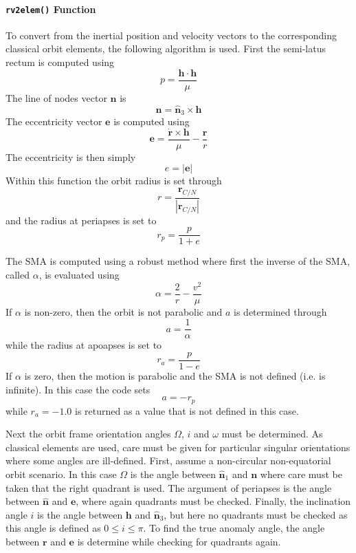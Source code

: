 \paragraph{{\tt rv2elem()} Function}
To convert from the inertial position and velocity vectors to the corresponding classical orbit elements, the following algorithm is used.  First the semi-latus rectum is computed using
\begin{equation}
	p = \frac{\bm h \cdot \bm h}{\mu}
\end{equation}
The line of nodes vector $\bm n$ is 
\begin{equation}
	\bm n = \hat{\bm n}_{3} \times \bm h
\end{equation}
The eccentricity vector $\bm e$ is computed using\cite{schaub}
\begin{equation}
	\bm e = \frac{\dot{\bm r} \times \bm h}{\mu} - \frac{\bm r}{r}
\end{equation}
The eccentricity is then simply
\begin{equation}
	e = |\bm e|
\end{equation}
Within this function the orbit radius is set through
\begin{equation}
	r = \frac{\bm r_{C/N}}{ | \bm r_{C/N}|}
\end{equation}
and the radius at periapses is set to
\begin{equation}
	r_{p} = \frac{p}{1 + e}
\end{equation}

The SMA is computed using a robust method where first the inverse of the SMA, called $\alpha$, is evaluated using\cite{schaub}
\begin{equation}
	\alpha = \frac{2}{r} - \frac{v^{2}}{\mu}
\end{equation}
If $\alpha$ is non-zero, then the orbit is not parabolic and $a$ is determined through
\begin{equation}
	a = \frac{1}{\alpha}
\end{equation}
while the radius at apoapses is set to
\begin{equation}
	r_{a} = \frac{p}{1 - e}
\end{equation}
If $\alpha$ is zero, then the motion is parabolic and the SMA is not defined (i.e. is infinite).  In this case the code sets 
$$
	a = -r_{p}
$$
while $r_{a} = -1.0$ is returned as a value that is not defined in this case.


Next the orbit frame orientation angles $\Omega$, $i$ and $\omega$ must be determined.  As classical elements are used, care must be given for particular singular orientations where some angles are ill-defined.  First, assume a non-circular non-equatorial orbit scenario.  In this case $\Omega$ is the angle between $\hat{\bm n}_{1}$ and $\bm n$ where care must be taken that the right quadrant is used.  The argument of periapses is the angle between $\hat{\bm n}$ and $\bm e$, where again quadrants must be checked.  Finally, the inclination angle $i$ is the angle between $\bm h$ and $\hat{\bm n}_{3}$, but here no quadrants must be checked as this angle is defined as $0 \le i \le \pi$.  To find the true anomaly angle, the angle between $\bm r$ and $\bm e$ is determine while checking for quadrants again.

